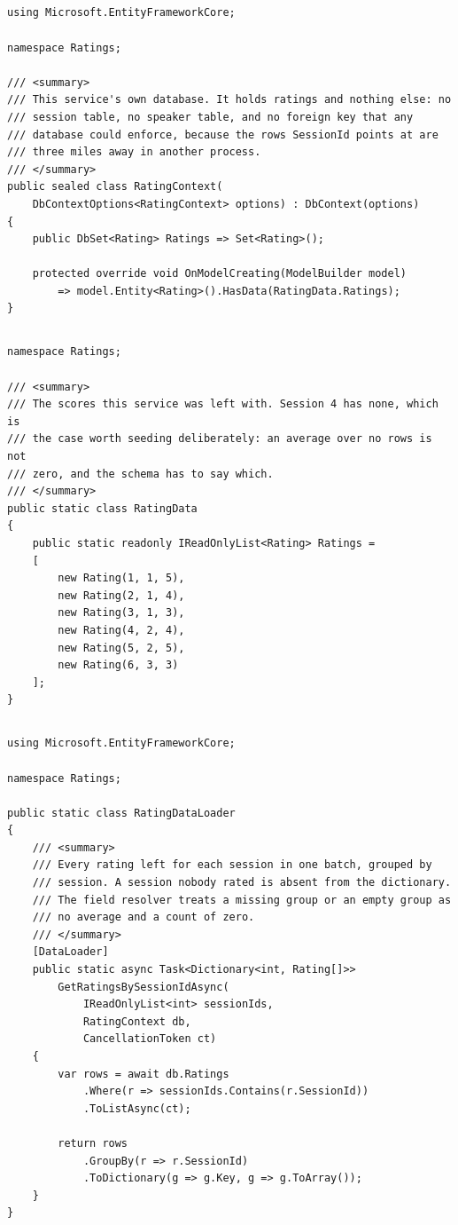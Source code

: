 \subsection*{}
\begin{verbatim}
using Microsoft.EntityFrameworkCore;

namespace Ratings;

/// <summary>
/// This service's own database. It holds ratings and nothing else: no
/// session table, no speaker table, and no foreign key that any
/// database could enforce, because the rows SessionId points at are
/// three miles away in another process.
/// </summary>
public sealed class RatingContext(
    DbContextOptions<RatingContext> options) : DbContext(options)
{
    public DbSet<Rating> Ratings => Set<Rating>();

    protected override void OnModelCreating(ModelBuilder model)
        => model.Entity<Rating>().HasData(RatingData.Ratings);
}
\end{verbatim}

\subsection*{}
\begin{verbatim}
namespace Ratings;

/// <summary>
/// The scores this service was left with. Session 4 has none, which is
/// the case worth seeding deliberately: an average over no rows is not
/// zero, and the schema has to say which.
/// </summary>
public static class RatingData
{
    public static readonly IReadOnlyList<Rating> Ratings =
    [
        new Rating(1, 1, 5),
        new Rating(2, 1, 4),
        new Rating(3, 1, 3),
        new Rating(4, 2, 4),
        new Rating(5, 2, 5),
        new Rating(6, 3, 3)
    ];
}
\end{verbatim}

\subsection*{}
\begin{verbatim}
using Microsoft.EntityFrameworkCore;

namespace Ratings;

public static class RatingDataLoader
{
    /// <summary>
    /// Every rating left for each session in one batch, grouped by
    /// session. A session nobody rated is absent from the dictionary.
    /// The field resolver treats a missing group or an empty group as
    /// no average and a count of zero.
    /// </summary>
    [DataLoader]
    public static async Task<Dictionary<int, Rating[]>>
        GetRatingsBySessionIdAsync(
            IReadOnlyList<int> sessionIds,
            RatingContext db,
            CancellationToken ct)
    {
        var rows = await db.Ratings
            .Where(r => sessionIds.Contains(r.SessionId))
            .ToListAsync(ct);

        return rows
            .GroupBy(r => r.SessionId)
            .ToDictionary(g => g.Key, g => g.ToArray());
    }
}
\end{verbatim}

